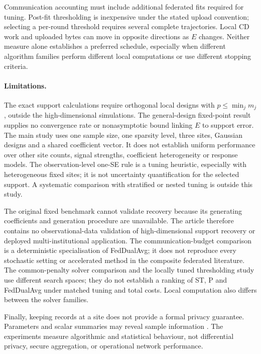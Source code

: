Communication accounting must include additional federated fits required
for tuning. Post-fit thresholding is inexpensive under the stated upload
convention; selecting a per-round threshold requires several complete
trajectories. Local CD work and uploaded bytes can move in opposite
directions as $E$ changes. Neither measure alone establishes a preferred
schedule, especially when different algorithm families perform different
local computations or use different stopping criteria.

\paragraph{Limitations.}
The exact support calculations require orthogonal local designs with
$p\le\min_jm_j$, outside the high-dimensional simulations. The
general-design fixed-point result supplies no convergence rate or
nonasymptotic bound linking $E$ to support error. The main study uses one
sample size, one sparsity level, three sites, Gaussian designs and a shared
coefficient vector. It does not establish uniform performance over other
site counts, signal strengths, coefficient heterogeneity or response models.
The observation-level one-SE rule is a tuning heuristic, especially with
heterogeneous fixed sites; it is not uncertainty quantification for the
selected support. A systematic comparison with stratified or nested tuning
is outside this study.

The original fixed benchmark cannot validate recovery because its generating
coefficients and generation procedure are unavailable. The article therefore contains
no observational-data validation of high-dimensional support recovery or
deployed multi-institutional application. The
communication-budget comparison is a deterministic specialisation of
FedDualAvg; it does not reproduce every stochastic setting or accelerated
method in the composite federated literature. The common-penalty solver
comparison and the locally tuned thresholding study use different search
spaces; they do not establish a ranking of ST, P and FedDualAvg under
matched tuning and total costs. Local computation also differs between
the solver families.

Finally, keeping records at a site does not provide a formal privacy
guarantee. Parameters and scalar summaries may reveal sample information
\citep{zhu2021}. The experiments measure algorithmic and statistical
behaviour, not differential privacy, secure aggregation, or operational
network performance.
